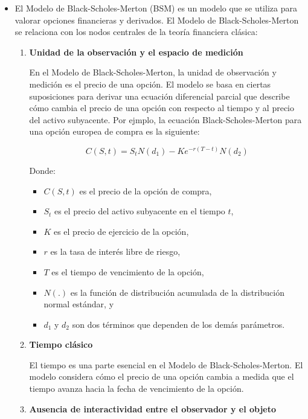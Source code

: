 \begin{problema}
\begin{sol}
\begin{itemize}

    \item El Modelo de Black-Scholes-Merton (BSM) es un modelo que se utiliza para valorar opciones financieras y derivados. El Modelo de Black-Scholes-Merton se relaciona con los nodos centrales de la teoría financiera clásica:

    \begin{enumerate}
    \item \textbf{Unidad de la observación y el espacio de medición}
    
    En el Modelo de Black-Scholes-Merton, la unidad de observación y medición es el precio de una opción. El modelo se basa en ciertas suposiciones para derivar una ecuación diferencial parcial que describe cómo cambia el precio de una opción con respecto al tiempo y al precio del activo subyacente. Por ejmplo, la ecuación Black-Scholes-Merton para una opción europea de compra es la siguiente:
    
    \begin{equation*}
    C(S, t) = S_tN(d_1) - Ke^{-r(T-t)}N(d_2)
    \end{equation*}
    
    Donde:
    \begin{itemize}
    \item $C(S, t)$ es el precio de la opción de compra,
    \item $S_t$ es el precio del activo subyacente en el tiempo $t$,
    \item $K$ es el precio de ejercicio de la opción,
    \item $r$ es la tasa de interés libre de riesgo,
    \item $T$ es el tiempo de vencimiento de la opción,
    \item $N(.)$ es la función de distribución acumulada de la distribución normal estándar, y
    \item $d_1$ y $d_2$ son dos términos que dependen de los demás parámetros.
    \end{itemize}
    
    \item \textbf{Tiempo clásico}
    
    El tiempo  es una parte esencial en el Modelo de Black-Scholes-Merton. El modelo considera cómo el precio de una opción cambia a medida que el tiempo avanza hacia la fecha de vencimiento de la opción. 
    
    \item \textbf{Ausencia de interactividad entre el observador y el objeto}
    

\end{enumerate}
\end{itemize}
\end{sol}
\end{problema}
